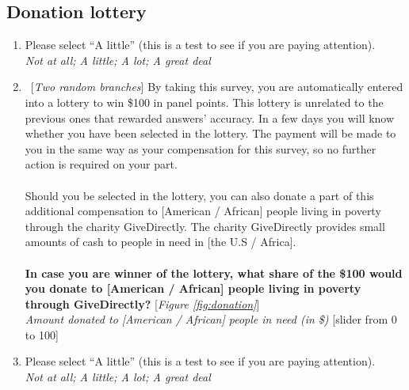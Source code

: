 \subsection*{Donation lottery}
\begin{enumerate}[resume] \item Please select ``A little'' (this is a test to see if you are paying attention).
\\ \textit{Not at all; A little; A lot; A great deal}
\item ~[\textit{Two random branches}] \label{q:donation} By taking this survey, you are automatically entered into a lottery to win \$100 in panel points. This lottery is unrelated to the previous ones that rewarded answers' accuracy. In a few days you will know whether you have been selected in the lottery. The payment will be made to you in the same way as your compensation for this survey, so no further action is required on your part.\\
\\
Should you be selected in the lottery, you can also donate a part of this additional compensation to [American / African] people living in poverty through the charity GiveDirectly. The charity GiveDirectly provides small amounts of cash to people in need in [the U.S / Africa].\\
\\
\textbf{In case you are winner of the lottery, what share of the \$100 would you donate to [American / African] people living in poverty through GiveDirectly?}  [\textit{Figure \ref{fig:donation}}]
\\ \textit{Amount donated to [American / African] people in need (in \$)} [slider from 0 to 100]
\item Please select ``A little'' (this is a test to see if you are paying attention).
\\ \textit{Not at all; A little; A lot; A great deal}
\end{enumerate}

